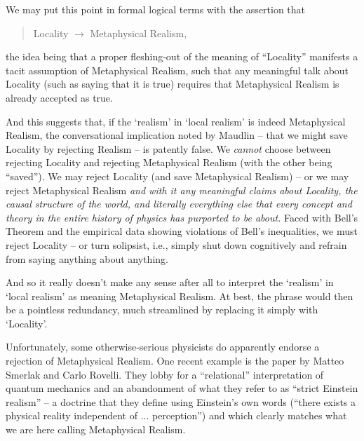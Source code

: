 \documentclass[12pt]{article}
\begin{document}
We may put this point in formal logical terms with the assertion that
\begin{quote}
Locality $\rightarrow$ Metaphysical Realism, 
\end{quote}
the idea being that a proper fleshing-out of the meaning of
``Locality'' manifests a tacit assumption of Metaphysical Realism,
such that any meaningful talk about Locality (such as saying that it
is true) requires that 
Metaphysical Realism is already accepted as true.  

And this suggests that, if the `realism' in `local realism' is indeed
Metaphysical Realism, the conversational implication noted by Maudlin
-- that we might save Locality by rejecting Realism -- is
patently false.  We \emph{cannot} choose between rejecting Locality and 
rejecting Metaphysical Realism (with the other being ``saved'').  We
may reject Locality (and save Metaphysical Realism) -- or we may reject
Metaphysical Realism \emph{and with it any meaningful claims about
  Locality, the causal structure of the world, and literally
  everything else that every concept and theory in the entire history
  of physics has purported to be about.}  Faced with
Bell's Theorem and the empirical data showing violations of Bell's
inequalities, we must reject Locality -- or turn solipsist, i.e.,
simply shut down
cognitively and refrain from saying anything about anything.  

And so it really doesn't make any sense after all to interpret the
`realism' in `local realism' as meaning Metaphysical Realism.  At
best, the phrase would then be a pointless redundancy, much
streamlined by replacing it simply with `Locality'.  

Unfortunately, some otherwise-serious physicists do apparently
endorse a rejection of Metaphysical Realism.  One recent
example is the paper by Matteo Smerlak and Carlo Rovelli. \cite{rovelli}  
They lobby for a ``relational'' interpretation of quantum mechanics
and an abandonment of what they refer to as ``strict Einstein
realism'' -- a doctrine that they define using Einstein's own words
(``there exists a physical reality independent of ... perception'')
and which clearly matches what we are here calling Metaphysical
Realism.  
\end{document}
